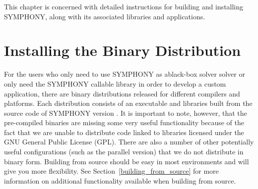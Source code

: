 
This chapter is concerned with detailed instructions for building and
installing SYMPHONY, along with its associated libraries and applications.

\section{Installing the Binary Distribution}

For the users who only need to use SYMPHONY as ablack-box solver solver or
only need the SYMPHONY callable library in order to develop a custom
application, there are binary distributions released for different compilers
and platforms. Each distribution consists of an executable and libraries built
from the source code of SYMPHONY version \VER. It is important to note,
however, that the pre-compiled binaries are missing some very useful
functionality because of the fact that we are unable to distribute code linked
to libraries licensed under the GNU General Public License (GPL). There are
also a number of other potentially useful configurations (such as the parallel
version) that we do not distribute in binary form. Building from source should
be easy in most environments and will give you more flexibility. See
Section~\ref{building_from_source} for more information on additional
functionality available when building from source.
 
